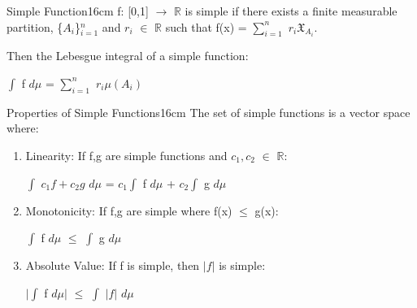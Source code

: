     \vspace{0.5cm}



    \begin{definition}{Simple Function}{16cm}
        f: [0,1] $\rightarrow$ $\mathbb{R}$ is {\color{lblue} simple}
        if there exists a finite measurable partition, \{$A_i$\}$_{i=1}^n$
        and $r_i$ $\in$ $\mathbb{R}$ such that
        f(x) = $\sum_{i=1}^n$ $r_i \mathfrak{X}_{A_i}$.

        Then the {\color{lblue} Lebesgue integral} of a simple function:

        \hspace{0.5cm}
        $\int$ f $d\mu$ = $\sum_{i=1}^n$ $r_i \mu(A_i)$
    \end{definition}

    \vspace{0.5cm}



    \begin{wtheorem}{Properties of Simple Functions}{16cm}
        The set of simple functions is a vector space where:
    \end{wtheorem}

    \begin{enumerate}[label=(\alph*), leftmargin=2cm, itemsep=0.1cm]
        \item {\color{lgreen} Linearity}:
            If f,g are simple functions and $c_1,c_2$ $\in$ $\mathbb{R}$:

            \hspace{0.5cm}
            $\int$ $c_1f + c_2g$ $d\mu$
            = $c_1 \int$ f $d\mu$ + $c_2 \int$ g $d\mu$

        \item {\color{lgreen} Monotonicity}:
            If f,g are simple where f(x) $\leq$ g(x):
            
            \hspace{0.5cm}
            $\int$ f $d\mu$ $\leq$ $\int$ g $d\mu$

        \item {\color{lgreen} Absolute Value}:
            If f is simple, then $|f|$ is simple:

            \hspace{0.5cm}
            $|\int$ f $d\mu|$ $\leq$ $\int$ $|f|$ $d\mu$
    \end{enumerate}

